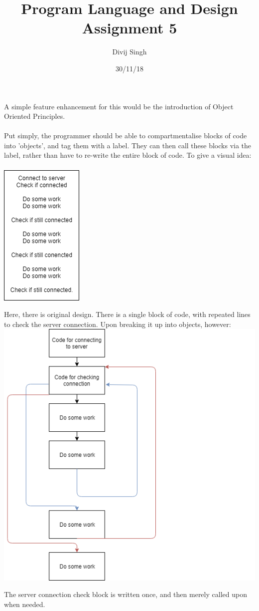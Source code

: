 \documentclass{article}
\title{Program Language and Design Assignment 5}
\author{Divij Singh}
\date{30/11/18}
\begin{document}
	\maketitle
	A simple feature enhancement for this would be the introduction of Object Oriented Principles.\\ \\
Put simply, the programmer should be able to compartmentalise blocks of code into 'objects', and tag them with a label. They can then call these blocks via the label, rather than have to re-write the entire block of code. To give a visual idea:\\ \\


\includegraphics{normal.png}

Here, there is original design. There is a single block of code, with repeated lines to check the server connection. Upon breaking it up into objects, however: \\

\includegraphics[scale=0.8]{suggested.png}

The server connection check block is written once, and then merely called upon when needed.
\end{document}
